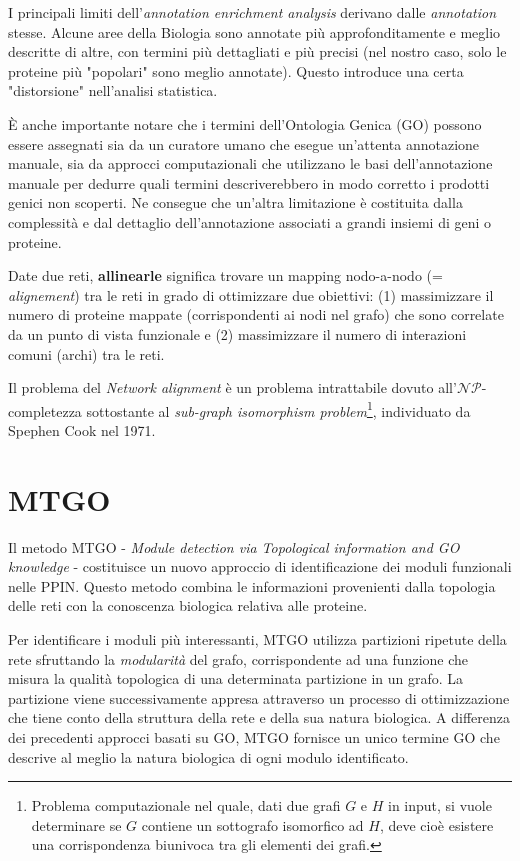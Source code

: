 \documentclass[11pt]{article}
\begin{document}
I principali limiti dell'\textit{annotation enrichment analysis} derivano dalle \textit{annotation} stesse. Alcune aree della Biologia sono annotate più approfonditamente e meglio descritte di altre, con termini più dettagliati e più precisi (nel nostro caso, solo le proteine più "popolari" sono meglio annotate). Questo introduce una certa "distorsione" nell'analisi statistica.

È anche importante notare che i termini dell'Ontologia Genica (GO) possono essere assegnati sia da un curatore umano che esegue un'attenta annotazione manuale, sia da approcci computazionali che utilizzano le basi dell'annotazione manuale per dedurre quali termini descriverebbero in modo corretto i prodotti genici non scoperti. Ne consegue che un'altra limitazione è costituita dalla complessità e dal dettaglio dell'annotazione associati a grandi insiemi di geni o proteine. 
\pagebreak


Date due reti, \textbf{allinearle} significa trovare un mapping nodo-a-nodo (= \textit{alignement}) tra le reti in grado di ottimizzare due obiettivi: (1) massimizzare il numero di proteine mappate (corrispondenti ai nodi nel grafo) che sono correlate da un punto di vista funzionale e (2) massimizzare il numero di interazioni comuni (archi) tra le reti.

Il problema del \textit{Network alignment} è un problema intrattabile dovuto all'$\mathcal{NP}$-completezza sottostante al \textit{sub-graph isomorphism problem}\footnote{Problema computazionale nel quale, dati due grafi $G$ e $H$ in input, si vuole determinare se $G$ contiene un sottografo isomorfico ad $H$, deve cioè esistere una corrispondenza biunivoca tra gli elementi dei grafi.}, individuato da Spephen Cook nel 1971.

\section{MTGO}
Il metodo MTGO - \textit{Module detection via Topological information and GO knowledge} - costituisce un nuovo approccio di identificazione dei moduli funzionali nelle PPIN. Questo metodo combina le informazioni provenienti dalla topologia delle reti con la conoscenza biologica relativa alle proteine.
 
Per identificare i moduli più interessanti, MTGO utilizza partizioni ripetute della rete sfruttando la \textit{modularità} del grafo, corrispondente ad una funzione che misura la qualità topologica di una determinata partizione in un grafo. La partizione viene successivamente appresa attraverso un processo di ottimizzazione che tiene conto della struttura della rete e della sua natura biologica. A differenza dei precedenti approcci basati su GO, MTGO fornisce un unico termine GO che descrive al meglio la natura biologica di ogni modulo identificato.
\end{document}
